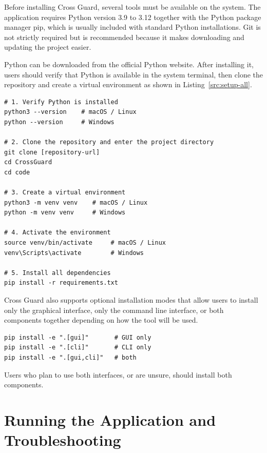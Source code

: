 Before installing Cross Guard, several tools must be available on the system. The application requires Python version 3.9 to 3.12 together with the Python package manager pip, which is usually included with standard Python installations. Git is not strictly required but is recommended because it makes downloading and updating the project easier.

Python can be downloaded from the official Python website. After installing it, users should verify that Python is available in the system terminal, then clone the repository and create a virtual environment as shown in Listing~\ref{src:setup-all}.

\begin{lstlisting}[caption={Complete setup: verify Python, clone the repository, create and activate a virtual environment, and install dependencies}, label=src:setup-all, basicstyle=\ttfamily\small, breaklines=true]
# 1. Verify Python is installed
python3 --version    # macOS / Linux
python --version     # Windows

# 2. Clone the repository and enter the project directory
git clone [repository-url]
cd CrossGuard
cd code

# 3. Create a virtual environment
python3 -m venv venv    # macOS / Linux
python -m venv venv     # Windows

# 4. Activate the environment
source venv/bin/activate     # macOS / Linux
venv\Scripts\activate        # Windows

# 5. Install all dependencies
pip install -r requirements.txt
\end{lstlisting}
\newpage

Cross Guard also supports optional installation modes that allow users to install only the graphical interface, only the command line interface, or both components together depending on how the tool will be used.

\begin{lstlisting}[caption={Optional installation modes}, basicstyle=\ttfamily\small]
pip install -e ".[gui]"       # GUI only
pip install -e ".[cli]"       # CLI only
pip install -e ".[gui,cli]"   # both
\end{lstlisting}

Users who plan to use both interfaces, or are unsure, should install both components.

\section{Running the Application and Troubleshooting}
\label{sec:running}

